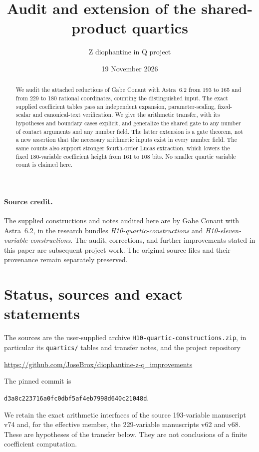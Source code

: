 \documentclass[11pt]{article}
\title{Audit and extension of the shared-product quartics}
\author{Z diophantine in Q project}
\date{19 November 2026}
\theoremstyle{remark}\newtheorem{remark}[theorem]{Remark}
\begin{document}
\maketitle
\begin{abstract}
We audit the attached reductions of Gabe Conant with Astra~6.2 from 193 to 165 and from
229 to 180 rational coordinates, counting the distinguished input.
The exact supplied coefficient tables pass an independent expansion,
parameter-scaling, fixed-scalar and canonical-text verification.
We give the arithmetic transfer, with its hypotheses and boundary
cases explicit, and generalize the shared gate to any number of contact
arguments and any number field. The latter extension is a gate theorem,
not a new assertion that the necessary arithmetic inputs exist in every
number field. The same counts also support stronger fourth-order Lucas extraction,
which lowers the fixed 180-variable coefficient height from 161 to
108 bits. No smaller quartic variable count is claimed here.
\end{abstract}

\paragraph{Source credit.}
The supplied constructions and notes audited here are by Gabe Conant with
Astra~6.2, in the research bundles
\emph{H10-quartic-constructions} and
\emph{H10-eleven-variable-constructions}.
The audit, corrections, and further improvements stated in this paper are
subsequent project work. The original source files and their provenance
remain separately preserved.

\section{Status, sources and exact statements}
The sources are the user-supplied archive
\texttt{H10-quartic-constructions.zip}, in particular its
\texttt{quartics/} tables and transfer notes, and the project repository
\begin{center}\small
\url{https://github.com/JoseBrox/diophantine-z-q_improvements}
\end{center}
The pinned commit is
\begin{center}\small
\texttt{d3a8c223716a0fc0dbf5af4eb7998d640c21048d}.
\end{center}
We retain the exact arithmetic interfaces of the source 193-variable
manuscript v74 and, for the effective member, the 229-variable
manuscripts v62 and v68. These are hypotheses of the transfer below.
They are not conclusions of a finite coefficient computation.
\end{document}
